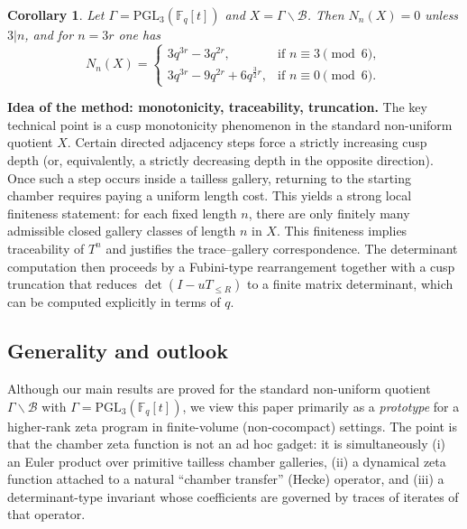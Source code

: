\documentclass[11pt]{amsart}
\newtheorem{corollary}[thm]{Corollary}
\theoremstyle{definition}
\theoremstyle{remark}
\numberwithin{equation}{section}
\begin{document}
\begin{corollary}\label{coro:intro_count}
Let $\Gamma=\mathrm{PGL}_3(\mathbb{F}_q[t])$ and $X=\Gamma\backslash\mathcal{B}$.
Then $N_n(X)=0$ unless $3|n$, and for $n=3r$ one has
\[
N_{n}(X)=
\begin{cases}
3q^{3r}-3q^{2r}, & \text{if } n\equiv 3 \pmod{6},\\
3q^{3r}-9q^{2r}+6q^{\frac{3}{2}r}, & \text{if } n\equiv 0 \pmod{6}.
\end{cases}
\]
\end{corollary}

\medskip

\noindent\textbf{Idea of the method: monotonicity, traceability, truncation.}
The key technical point is a cusp monotonicity phenomenon in the standard non-uniform quotient $X$.
Certain directed adjacency steps force a strictly increasing cusp depth (or, equivalently, a strictly decreasing depth in the opposite direction).
Once such a step occurs inside a tailless gallery, returning to the starting chamber requires paying a uniform length cost.
This yields a strong local finiteness statement: for each fixed length $n$, there are only finitely many admissible closed gallery classes of length $n$ in $X$.
This finiteness implies traceability of $T^n$ and justifies the trace--gallery correspondence.
The determinant computation then proceeds by a Fubini-type rearrangement together with a cusp truncation that reduces $\det(I-uT_{\le R})$ to a finite matrix determinant, which can be computed explicitly in terms of $q$.

\subsection*{Generality and outlook}

Although our main results are proved for the standard non-uniform quotient
$\Gamma\backslash\mathcal{B}$ with $\Gamma=\mathrm{PGL}_{3}(\mathbb{F}_{q}[t])$,
we view this paper primarily as a \emph{prototype} for a higher-rank zeta program
in finite-volume (non-cocompact) settings.
The point is that the chamber zeta function is not an ad hoc gadget:
it is simultaneously
(i) an Euler product over primitive tailless chamber galleries,
(ii) a dynamical zeta function attached to a natural ``chamber transfer''
(Hecke) operator,
and (iii) a determinant-type invariant whose coefficients are governed by traces
of iterates of that operator.
\end{document}
